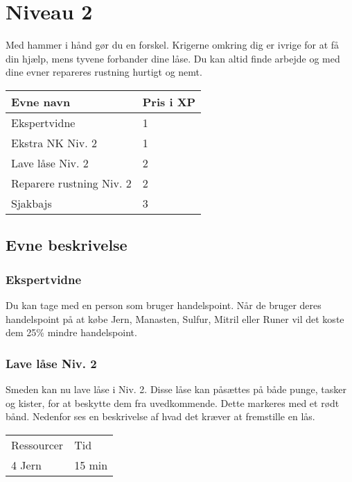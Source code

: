 \chapter{Niveau 2}
Med hammer i hånd gør du en forskel. Krigerne omkring dig er ivrige for at få din hjælp, mens tyvene forbander dine låse. Du kan altid finde arbejde og med dine evner repareres rustning hurtigt og nemt.
\begin{table}[H]
    \centering
    \begin{tabular}{|p{}|p{}|}
    \rowcolor{cerulean!80}\hline
    Evne navn & Pris i XP \\\hline
    Ekspertvidne & 1 \\\hline
    Ekstra NK Niv. 2 & 1\\\hline
    Lave låse Niv. 2 & 2\\\hline
    Reparere rustning Niv. 2 & 2\\\hline
    Sjakbajs & 3 \\\hline
    \end{tabular}
\end{table}
\section{Evne beskrivelse}

\subsection{Ekspertvidne}
Du kan tage med en person som bruger handelspoint. Når de bruger deres handelspoint på at købe Jern, Manasten, Sulfur, Mitril eller Runer vil det koste dem 25\% mindre handelspoint.



\subsection{Lave låse Niv. 2}
Smeden kan nu lave låse i Niv. 2. Disse låse kan påsættes på både punge, tasker og kister, for at beskytte dem fra uvedkommende. Dette markeres med et rødt bånd. Nedenfor ses en beskrivelse af hvad det kræver at fremstille en lås.\\

\begin{table}[H]
    \centering
    \begin{tabular}{|p{}|p{}|}
    \hline
    \rowcolor{cerulean!80}
    \multicolumn{2}{c}{Lås Niv. 2}\\
    \hline
    \rowcolor{cerulean!40}
         Ressourcer & Tid \\\hline
         4 Jern & 15 min\\\hline
    \end{tabular}
    \end{table}
    
